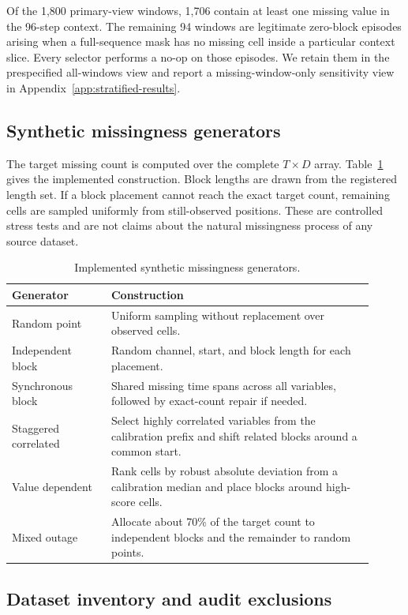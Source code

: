 Of the 1,800 primary-view windows, 1,706 contain at least one missing value in the 96-step context. The remaining 94 windows are legitimate zero-block episodes arising when a full-sequence mask has no missing cell inside a particular context slice. Every selector performs a no-op on those episodes. We retain them in the prespecified all-windows view and report a missing-window-only sensitivity view in Appendix~\ref{app:stratified-results}.

\subsection{Synthetic missingness generators}

The target missing count is computed over the complete $T\times D$ array. Table~\ref{tab:mechanisms} gives the implemented construction. Block lengths are drawn from the registered length set. If a block placement cannot reach the exact target count, remaining cells are sampled uniformly from still-observed positions. These are controlled stress tests and are not claims about the natural missingness process of any source dataset.

\begin{table}[h]
\centering
\small
\caption{Implemented synthetic missingness generators.}
\label{tab:mechanisms}
\begin{tabular}{p{0.25\linewidth}p{0.66\linewidth}}
\toprule
Generator & Construction \\
\midrule
Random point & Uniform sampling without replacement over observed cells. \\
Independent block & Random channel, start, and block length for each placement. \\
Synchronous block & Shared missing time spans across all variables, followed by exact-count repair if needed. \\
Staggered correlated & Select highly correlated variables from the calibration prefix and shift related blocks around a common start. \\
Value dependent & Rank cells by robust absolute deviation from a calibration median and place blocks around high-score cells. \\
Mixed outage & Allocate about 70\% of the target count to independent blocks and the remainder to random points. \\
\bottomrule
\end{tabular}
\end{table}

\subsection{Dataset inventory and audit exclusions}


